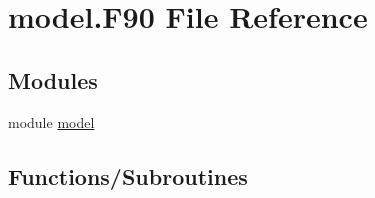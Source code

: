 \hypertarget{model_8_f90}{
\section{model.F90 File Reference}
\label{model_8_f90}
}
\subsection*{Modules}
\begin{DoxyCompactItemize}
\item 
module \hyperlink{namespacemodel}{model}
\end{DoxyCompactItemize}
\subsection*{Functions/Subroutines}
